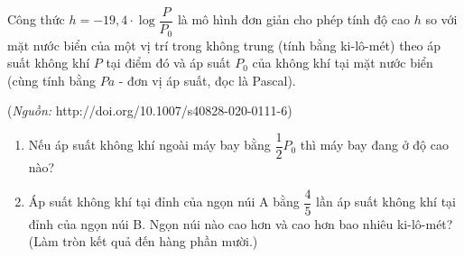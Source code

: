 \begin{bt}%
	Công thức $h=-19{,}4\cdot\log\dfrac{P}{P_0}$ là mô hình đơn giản cho phép tính độ cao $h$ so với mặt nước biển của một vị trí trong không trung (tính bằng ki-lô-mét) theo áp suất không khí $P$ tại điểm đó và áp suất $P_0$ của không khí tại mặt nước biển (cùng tính bằng $Pa$ - đơn vị áp suất, đọc là Pascal).
	\begin{center}
		(\textit{Nguồn:}  http://doi.org/10.1007/s40828-020-0111-6)
	\end{center}
	\begin{enumerate}
		\item Nếu áp suất không khí ngoài máy bay bằng $\dfrac{1}{2}P_0$ thì máy bay đang ở độ cao nào?
		\item Áp suất không khí tại đỉnh của ngọn núi A bằng $\dfrac{4}{5}$ lần áp suất không khí tại đỉnh của ngọn núi B. Ngọn núi nào cao hơn và cao hơn bao nhiêu ki-lô-mét? (Làm tròn kết quả đến hàng phần mười.)
	\end{enumerate}
\end{bt}

